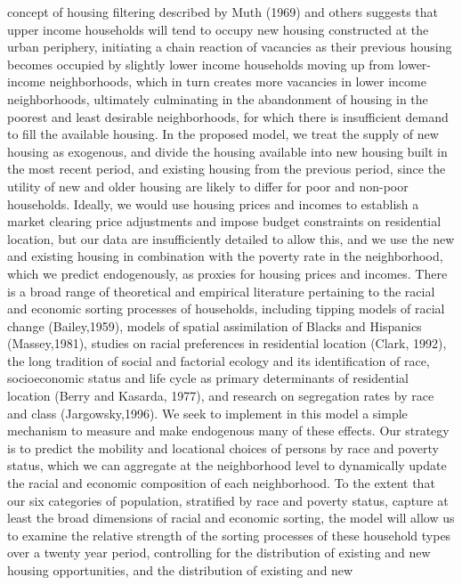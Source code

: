 \documentclass[12pt,a4paper]{article}
\begin{document}
concept of housing filtering described by Muth (1969) and others
suggests that upper income households will tend to occupy new
housing constructed at the urban periphery, initiating a chain
reaction of vacancies as their previous housing becomes occupied
by slightly lower income households moving up from lower-income
neighborhoods, which in turn creates more vacancies in lower
income neighborhoods, ultimately culminating in the abandonment of
housing in the poorest and least desirable neighborhoods, for
which there is insufficient demand to fill the available housing.
In the proposed model, we treat the supply of new housing as
exogenous, and divide the housing available into new housing built
in the most recent period, and existing housing from the previous
period, since the utility of new and older housing are likely to
differ for poor and non-poor households.  Ideally, we would use
housing prices and incomes to establish a market clearing price
adjustments and impose budget constraints on residential location,
but our data are insufficiently detailed to allow this, and we use
the new and existing housing in combination with the poverty rate
in the neighborhood, which we predict endogenously, as proxies for
housing prices and incomes. There is a broad range of theoretical
and empirical literature pertaining to the racial and economic
sorting processes of households, including tipping models of
racial change (Bailey,1959), models of spatial assimilation of
Blacks and Hispanics (Massey,1981), studies on racial preferences
in residential location (Clark, 1992), the long tradition of
social and factorial ecology and its identification of race,
socioeconomic status and life cycle as primary determinants of
residential location (Berry and Kasarda, 1977), and research on
segregation rates by race and class (Jargowsky,1996).  We seek to
implement in this model a simple mechanism to measure and make
endogenous many of these effects.  Our strategy is to predict the
mobility and locational choices of persons by race and poverty
status, which we can aggregate at the neighborhood level to
dynamically update the racial and economic composition of each
neighborhood.  To the extent that our six categories of
population, stratified by race and poverty status, capture at
least the broad dimensions of racial and economic sorting, the
model will allow us to examine the relative strength of the
sorting processes of these household types over a twenty year
period, controlling for the distribution of existing and new
housing opportunities, and the distribution of existing and new
\end{document}
